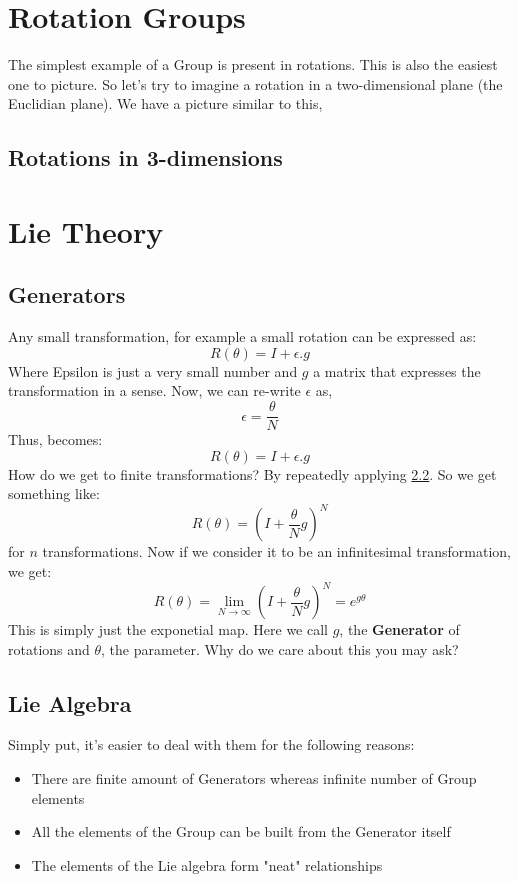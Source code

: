 \documentclass[]{article}
\begin{document}
\section{Rotation Groups}
The simplest example of a Group is present in rotations. This is also the easiest one to picture. So let's try to imagine a rotation in a two-dimensional plane (the Euclidian plane). We have a picture similar to this,
\subsection{Rotations in 3-dimensions}

\section{Lie Theory}
\subsection{Generators}
Any small transformation, for example a small rotation can be expressed as:
\begin{equation}
R(\theta) = I + \epsilon. g
\end{equation}
Where Epsilon is just a very small number and $g$ a matrix that expresses the transformation in a sense. Now, we can re-write $\epsilon$ as,
$$\epsilon = \frac{\theta}{N}$$
Thus, becomes:
\begin{equation}
R(\theta) = I + \epsilon. g
\end{equation}
How do we get to finite transformations? By repeatedly applying \ref{}. So we get something like:
\begin{equation}
R(\theta) = (I + \frac{\theta}{N}g)^{N}
\end{equation}
for $n$ transformations. Now if we consider it to be an infinitesimal transformation, we get:
\begin{equation}
R(\theta) = \lim\limits_{N \rightarrow \infty}(I + \frac{\theta}{N}g)^{N} = e^{g \theta}
\end{equation}
This is simply just the exponetial map. Here we call $g$, the \textbf{Generator} of rotations and $\theta$, the parameter. Why do we care about this you may ask?
\subsection{Lie Algebra}
Simply put, it's easier to deal with them for the following reasons:
\begin{itemize}
\item There are finite amount of Generators whereas infinite number of Group elements
\item All the elements of the Group can be built from the Generator itself
\item The elements of the Lie algebra form "neat" relationships
\end{itemize}
\end{document}
